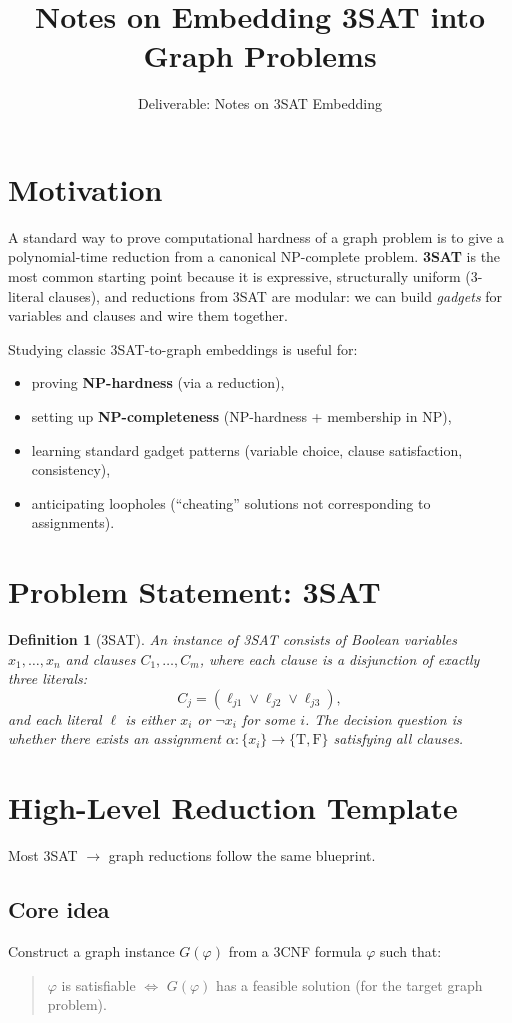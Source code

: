 \documentclass[11pt]{article}
\title{\vspace{-1.2cm}Notes on Embedding 3SAT into Graph Problems}
\author{Deliverable: Notes on 3SAT Embedding}
\date{}
\newtheorem{definition}{Definition}
\begin{document}
\maketitle

\section{Motivation}
A standard way to prove computational hardness of a graph problem is to give a polynomial-time reduction from a canonical NP-complete problem. \textbf{3SAT} is the most common starting point because it is expressive, structurally uniform (3-literal clauses), and reductions from 3SAT are modular: we can build \emph{gadgets} for variables and clauses and wire them together.

Studying classic 3SAT-to-graph embeddings is useful for:
\begin{itemize}[itemsep=2pt]
  \item proving \textbf{NP-hardness} (via a reduction),
  \item setting up \textbf{NP-completeness} (NP-hardness + membership in NP),
  \item learning standard gadget patterns (variable choice, clause satisfaction, consistency),
  \item anticipating loopholes (``cheating'' solutions not corresponding to assignments).
\end{itemize}

\section{Problem Statement: 3SAT}
\begin{definition}[3SAT]
An instance of \emph{3SAT} consists of Boolean variables $x_1,\dots,x_n$ and clauses $C_1,\dots,C_m$, where each clause is a disjunction of exactly three literals:
\[
C_j = (\ell_{j1} \lor \ell_{j2} \lor \ell_{j3}),
\]
and each literal $\ell$ is either $x_i$ or $\neg x_i$ for some $i$. The decision question is whether there exists an assignment $\alpha:\{x_i\}\to\{\text{T},\text{F}\}$ satisfying all clauses.
\end{definition}

\section{High-Level Reduction Template}
Most 3SAT $\to$ graph reductions follow the same blueprint.

\subsection*{Core idea}
Construct a graph instance $G(\varphi)$ from a 3CNF formula $\varphi$ such that:
\begin{quote}
$\varphi$ is satisfiable $\iff$ $G(\varphi)$ has a feasible solution (for the target graph problem).
\end{quote}
\end{document}
